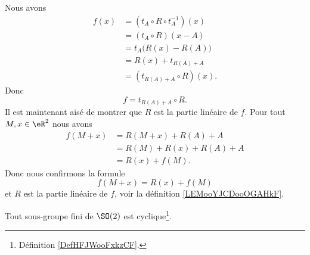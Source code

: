 \begin{example}
	Nous avons
	\begin{subequations}
		\begin{align}
			f(x) & =(t_A\circ R\circ t_A^{-1})(x) \\
			     & =(t_A\circ R)(x-A)             \\
			     & =t_A\big( R(x)-R(A) \big)      \\
			     & =R(x)+t_{R(A)+A}               \\
			     & =(t_{R(A)+A}\circ R)(x).
		\end{align}
	\end{subequations}
	Donc
	\begin{equation}
		f=t_{R(A)+A}\circ R.
	\end{equation}
	Il est maintenant aisé de montrer que \( R\) est la partie linéaire de \( f\). Pour tout \( M,x\in \eR^2\) nous avons
	\begin{subequations}
		\begin{align}
			f(M+x) & =R(M+x)+R(A)+A    \\
			       & =R(M)+R(x)+R(A)+A \\
			       & =R(x)+f(M).
		\end{align}
	\end{subequations}
	Donc nous confirmons la formule
	\begin{equation}
		f(M+x)=R(x)+f(M)
	\end{equation}
	et \( R\) est la partie linéaire de \( f\), voir la définition \ref{LEMooYJCDooOGAHkF}.
\end{example}

\begin{lemma}        \label{LEMooUKEVooAEWvlM}
    Tout sous-groupe fini de \( \SO(2)\) est cyclique\footnote{Définition \ref{DefHFJWooFxkzCF}.}.
\end{lemma}

